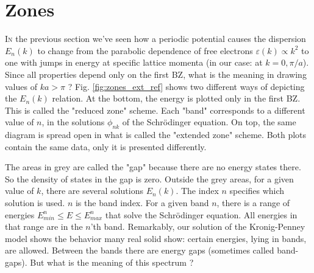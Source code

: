 \documentclass{Textbook}
\begin{document}
\section{Zones}
\lettrine[lines=3,slope=6pt,nindent=6pt]{\initfamily I}{n} the previous section we've seen how a periodic potential causes the dispersion $E_n(k)$ to change from the parabolic dependence of free electrons $ \varepsilon(k) \propto k^2$ to one with jumps in energy at specific lattice momenta (in our case: at $k=0,\pi/a$). Since all properties depend only on the first BZ, what is the meaning in drawing values of $ka>\pi$ ? Fig. \ref{fig:zones_ext_ref} shows two different ways of depicting the $E_n(k)$ relation. At the bottom, the energy is plotted only in the first BZ. This is called the "reduced zone" scheme. Each "band" corresponds to a different value of $n$, in the solutions $\phi_{nk}$ of the Schr{\"o}dinger equation. On top, the same diagram is spread open in what is called the "extended zone" scheme. Both plots contain the same data, only it is presented differently.


The areas in grey are called the "gap" because there are no energy states there. So the density of states in the gap is zero. Outside the grey areas, for a given value of $k$, there are several solutions $E_{n}(k)$. The index $n$ specifies which solution is used. $n$ is the band index.\nl
For a given band $n$, there is a range of energies $E_{min}^n\le E \le E_{max}^n$ that solve the Schr{\"o}dinger equation. All energies in that range are in the $n$'th band. \nl
Remarkably, our solution of the Kronig-Penney model shows the behavior many real solid show: certain energies, lying in bands, are allowed. Between the bands there are energy gaps (sometimes called band-gaps). But what is the meaning of this spectrum ?
\end{document}
